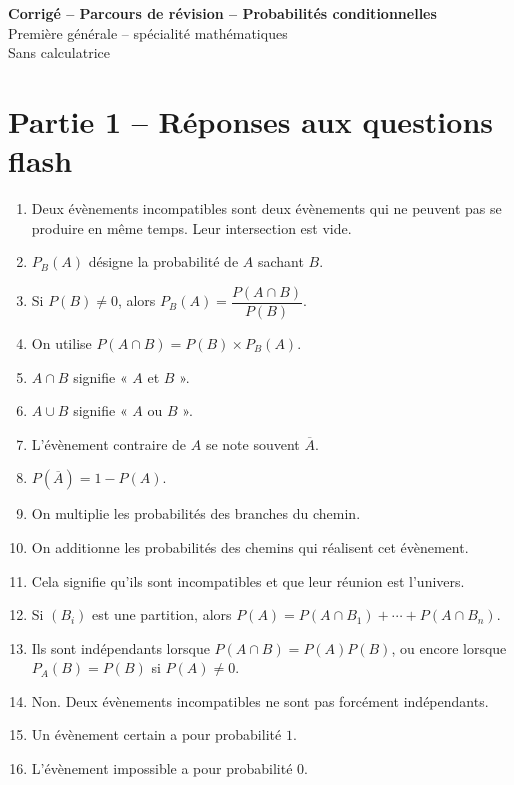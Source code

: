 \documentclass[11pt,a4paper]{article}
\newcounter{question}
\newcounter{reponse}
\newenvironment{blocreponses}[1]{%
  \begin{tcolorbox}[enhanced,breakable,colback=bleuclair,colframe=bleufonce,boxrule=0.6pt,arc=2mm,left=2mm,right=2mm,top=2mm,bottom=1.5mm,title={\bfseries #1},coltitle=white,colbacktitle=bleufonce,before skip=3mm,after skip=3mm, fontupper=\large]
  \large
  \begin{enumerate}[leftmargin=*,label=\textbf{\arabic*.},itemsep=0.45em,topsep=0.5em]
  \setcounter{enumi}{\value{reponse}}
}{%
  \setcounter{reponse}{\value{enumi}}
  \end{enumerate}
  \end{tcolorbox}
}
\begin{document}
\begin{center}
{\LARGE\bfseries Corrigé -- Parcours de révision -- Probabilités conditionnelles}\\[1mm]
{\large Première générale -- spécialité mathématiques}\\[1mm]
{\normalsize Sans calculatrice}
\end{center}
\vspace{2mm}
\tableofcontents
\clearpage

\section*{Partie 1 -- Réponses aux questions flash}
\setcounter{reponse}{0}
\begin{blocreponses}{Réponses -- Questions flash}
  \item Deux évènements incompatibles sont deux évènements qui ne peuvent pas se produire en même temps. Leur intersection est vide.
  \item $P_B(A)$ désigne la probabilité de $A$ sachant $B$.
  \item Si $P(B)\neq0$, alors $P_B(A)=\dfrac{P(A\cap B)}{P(B)}$.
  \item On utilise $P(A\cap B)=P(B)\times P_B(A)$.
  \item $A\cap B$ signifie « $A$ et $B$ ».
  \item $A\cup B$ signifie « $A$ ou $B$ ».
  \item L'évènement contraire de $A$ se note souvent $\overline A$.
  \item $P(\overline A)=1-P(A)$.
  \item On multiplie les probabilités des branches du chemin.
  \item On additionne les probabilités des chemins qui réalisent cet évènement.
  \item Cela signifie qu'ils sont incompatibles et que leur réunion est l'univers.
  \item Si $(B_i)$ est une partition, alors $P(A)=P(A\cap B_1)+\cdots+P(A\cap B_n)$.
  \item Ils sont indépendants lorsque $P(A\cap B)=P(A)P(B)$, ou encore lorsque $P_A(B)=P(B)$ si $P(A)\neq0$.
  \item Non. Deux évènements incompatibles ne sont pas forcément indépendants.
  \item Un évènement certain a pour probabilité $1$.
  \item L'évènement impossible a pour probabilité $0$.

\end{blocreponses}
\end{document}

